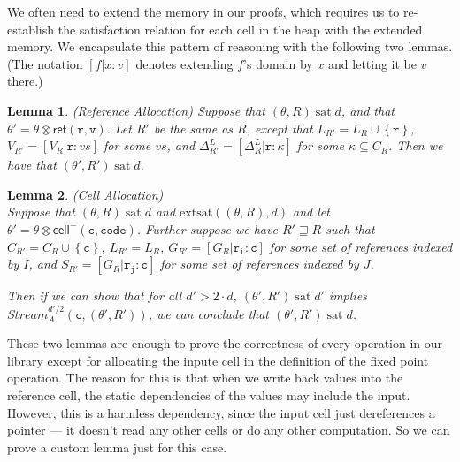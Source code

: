 \documentclass[nocopyrightspace,preprint]{sigplanconf}
\newcommand{\setof}[1]{\left\{{#1}\right\}}
\newcommand{\term}[1]{\ensuremath{\mathtt{{#1}}}}
\newcommand{\Stream}{\mathit{Stream}}
\newcommand{\cellminus}[2]{\mathsf{cell}^{-}({#1}, {#2})}
\newcommand{\satisfy}[2]{{#1}\;\mathrm{sat}\;{#2}}
\newcommand{\satisfyext}[2]{\mathrm{extsat}({#1}, {#2})}
\newtheorem{lemma}{Lemma}
\begin{document}
We often need to extend the memory in our proofs, which requires us to
re-establish the satisfaction relation for each cell in the heap with
the extended memory. We encapsulate this pattern of reasoning with the
following two lemmas. (The notation $[f|x:v]$ denotes 
extending $f$'s domain by $x$ and letting it be $v$ there.)

\begin{lemma}{(Reference Allocation)}
Suppose that $\satisfy{(\theta, R)}{d}$, and that $\theta' =
\theta \otimes \mathsf{ref}(\term{r,v})$. Let $R'$ be the same
as $R$, except that $L_{R'} = L_R \cup \setof{\term{r}}$, $V_{R'} = [V_R|\term{r}:vs]$ for some $vs$,
and $\Delta^L_{R'} = [\Delta^L_R|\term{r}:\kappa]$ for some $\kappa \subseteq C_R$.
Then we have that $\satisfy{(\theta', R')}{d}$. 
\end{lemma}

\begin{lemma}{(Cell Allocation)} \\
Suppose that $\satisfy{(\theta, R)}{d}$ and
$\satisfyext{(\theta,R)}{d}$ and let $\theta' = \theta \otimes
\cellminus{\term{c}}{\term{code}}$. Further suppose we have $R'
\sqsupseteq R$ such that $C_{R'} = C_R \cup \setof{\term{c}}$, $L_{R'}
= L_R$, $G_{R'} = [G_R | \term{r_i : c}]$ for some set of references
indexed by $I$, and $S_{R'} = [G_R | \term{r_j : c}]$ for some set of
references indexed by $J$.

Then if we can show that for all $d' > 2 \cdot d$,
$\satisfy{(\theta',R')}{d'}$ implies $\Stream^{d'/2}_A(\term{c},
(\theta', R'))$, we can conclude that $\satisfy{(\theta',R')}{d}$. 
\end{lemma}

These two lemmas are enough to prove the correctness of every
operation in our library except for allocating the inpute cell in the
definition of the fixed point operation. The reason for this is that
when we write back values into the reference cell, the static
dependencies of the values may include the input.  However, this is a
harmless dependency, since the input cell just dereferences a pointer
--- it doesn't read any other cells or do any other computation. So we
can prove a custom lemma just for this case.
\end{document}
